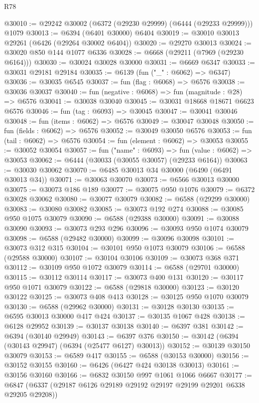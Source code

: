 \begin{lexlean}{R78}
\begin{coremodule}
@30010 := @29242 @30002 (@6372 (@29230 @29999) (@6444 (@29233 @29999))) @1079
@30013 := @6394 (@6401 @30000) @6404
@30019 := @30010 @30013 @29261 (@6426 (@29264 @30002 @6404))
@30020 := @29270 @30013
@30024 := @30020 @850 @144 @1077 @6336
@30028 := @6668 (@29211 (@7969 (@29230 @6164)))
@30030 := @30024 @30028 @30000
@30031 := @6669 @6347
@30033 := @30031 @29181 @29184
@30035 := @6139 (fun ("_" : @6062) => @6347)
@30036 := @30035 @6545
@30037 := fun (flag : @6068) => @6576
@30038 := @30036 @30037
@30040 := fun (negative : @6068) => fun (magnitude : @28) => @6576
@30041 := @30038 @30040
@30045 := @30031 @18668 @18671 @6623 @6576
@30046 := fun (tag : @6093) => @30045
@30047 := @30041 @30046
@30048 := fun (items : @6062) => @6576
@30049 := @30047 @30048
@30050 := fun (fields : @6062) => @6576
@30052 := @30049 @30050 @6576
@30053 := fun (tail : @6062) => @6576
@30054 := fun (element : @6062) => @30053
@30055 := @30052 @30054
@30057 := fun ("name" : @6093) => fun (value : @6062) => @30053
@30062 := @6444 (@30033 (@30055 @30057) (@29233 @6164))
@30063 := @30030 @30062
@30070 := @6485 @30013 @34 @30000 (@6490 (@6491 @30013 @34))
@30071 := @30063 @30070
@30073 := @6566 @30013 @30000
@30075 := @30073 @186 @189
@30077 := @30075 @950 @1076
@30079 := @6372 @30028 @30062
@30080 := @30077 @30079
@30082 := @6588 (@29299 @30000)
@30083 := @30080 @30082
@30085 := @30073 @192 @274
@30088 := @30085 @950 @1075 @30079
@30090 := @6588 (@29388 @30000)
@30091 := @30088 @30090
@30093 := @30073 @293 @296
@30096 := @30093 @950 @1074 @30079
@30098 := @6588 (@29482 @30000)
@30099 := @30096 @30098
@30101 := @30073 @312 @315
@30104 := @30101 @950 @1073 @30079
@30106 := @6588 (@29588 @30000)
@30107 := @30104 @30106
@30109 := @30073 @368 @371
@30112 := @30109 @950 @1072 @30079
@30114 := @6588 (@29701 @30000)
@30115 := @30112 @30114
@30117 := @30073 @400 @131
@30120 := @30117 @950 @1071 @30079
@30122 := @6588 (@29818 @30000)
@30123 := @30120 @30122
@30125 := @30073 @408 @413
@30128 := @30125 @950 @1070 @30079
@30130 := @6588 (@29962 @30000)
@30131 := @30128 @30130
@30135 := @6595 @30013 @30000 @417 @424
@30137 := @30135 @1067 @428
@30138 := @6128 @29952
@30139 := @30137 @30138
@30140 := @6397 @381
@30142 := @6394 (@30140 @29949)
@30143 := @6397 @376
@30150 := @30142 (@6394 (@30143 @29947) (@6394 (@25477 @6127) @30013))
@30152 := @30139 @30150 @30079
@30153 := @6589 @417
@30155 := @6588 (@30153 @30000)
@30156 := @30152 @30155
@30160 := @6426 (@6427 @424 @30138 @30013)
@30161 := @30156 @30160
@30166 := @6832 @30150 @997 @1061 @1066 @6667
@30177 := @6847 (@6337 (@29187 @6126 @29189 @29192 @29197 @29199 @29201 @6338 @29205 @29208))

\end{coremodule}
\end{lexlean}

